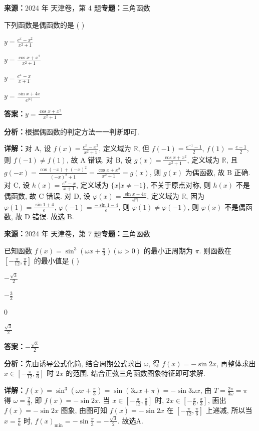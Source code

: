 \begin{question}[points=5]
\textbf{来源：}2024 年 天津卷，第 4 题\quad \textbf{专题：}三角函数\par
下列函数是偶函数的是 ( )
\begin{choices}
  \item $y = \frac{e^x - x^2}{x^2 + 1}$
  \item $y = \frac{\cos x + x^2}{x^2 + 1}$
  \item $y = \frac{e^x - x}{x + 1}$
  \item $y = \frac{\sin x + 4x}{e^{|x|}}$
\end{choices}
\begin{solution}
\textbf{答案：}$y = \frac{\cos x + x^2}{x^2 + 1}$

\textbf{分析：}根据偶函数的判定方法一一判断即可.

\textbf{详解：}对 A, 设 $f(x)=\frac{e^x-x^2}{x^2+1}$, 定义域为 $\mathbb{R}$, 但 $f(-1)=\frac{e^{-1}-1}{2}$, $f(1)=\frac{e-1}{2}$, 则 $f(-1)\neq f(1)$, 故 A 错误. 对 B, 设 $g(x)=\frac{\cos x+x^2}{x^2+1}$, 定义域为 $\mathbb{R}$, 且 $g(-x)=\frac{\cos(-x)+(-x)^2}{(-x)^2+1}=\frac{\cos x+x^2}{x^2+1}=g(x)$, 则 $g(x)$ 为偶函数, 故 B 正确. 对 C, 设 $h(x)=\frac{e^x-x}{x+1}$, 定义域为 $\{x|x\neq -1\}$, 不关于原点对称, 则 $h(x)$ 不是偶函数, 故 C 错误. 对 D, 设 $\varphi(x)=\frac{\sin x+4x}{e^{|x|}}$, 定义域为 $\mathbb{R}$, 因为 $\varphi(1)=\frac{\sin 1+4}{e}$, $\varphi(-1)=\frac{-\sin 1-4}{e}$, 则 $\varphi(1)\neq\varphi(-1)$, 则 $\varphi(x)$ 不是偶函数, 故 D 错误. 故选 B.
\end{solution}
\end{question}

\begin{question}[points=5]
\textbf{来源：}2024 年 天津卷，第 7 题\quad \textbf{专题：}三角函数\par
已知函数 $f(x)=\sin^3\left(\omega x + \frac{\pi}{3}\right) (\omega>0)$ 的最小正周期为 $\pi$. 则函数在 $\left[-\frac{\pi}{12},\frac{\pi}{6}\right]$ 的最小值是 ( )
\begin{choices}
  \item $-\frac{\sqrt{3}}{2}$
  \item $-\frac{3}{2}$
  \item $0$
  \item $\frac{\sqrt{3}}{2}$
\end{choices}
\begin{solution}
\textbf{答案：}$-\frac{\sqrt{3}}{2}$

\textbf{分析：}先由诱导公式化简, 结合周期公式求出 $\omega$, 得 $f(x)=-\sin 2x$, 再整体求出 $x\in\left[-\frac{\pi}{12},\frac{\pi}{6}\right]$ 时 $2x$ 的范围, 结合正弦三角函数图象特征即可求解.

\textbf{详解：}$f(x)=\sin^3\left(\omega x+\frac{\pi}{3}\right)=\sin(3\omega x+\pi)=-\sin 3\omega x$, 由 $T=\frac{2\pi}{3\omega}=\pi$ 得 $\omega=\frac{2}{3}$, 即 $f(x)=-\sin 2x$. 当 $x\in\left[-\frac{\pi}{12},\frac{\pi}{6}\right]$ 时, $2x\in\left[-\frac{\pi}{6},\frac{\pi}{3}\right]$, 画出 $f(x)=-\sin 2x$ 图象, 由图可知 $f(x)=-\sin 2x$ 在 $\left[-\frac{\pi}{12},\frac{\pi}{6}\right]$ 上递减, 所以当 $x=\frac{\pi}{6}$ 时, $f(x)_{\min}=-\sin\frac{\pi}{3}=-\frac{\sqrt{3}}{2}$. 故选A.
\end{solution}
\end{question}

